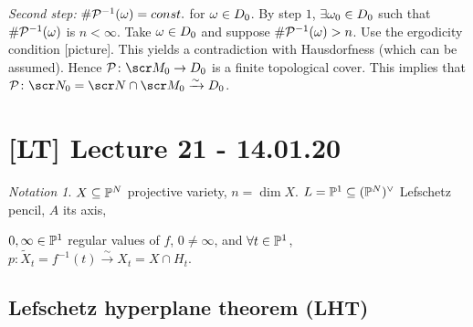 \documentclass[A4paper, british, reqno]{amsart}
\theoremstyle{darkgreentheorem}
\theoremstyle{darkbluedefinition}
\theoremstyle{darkredexample}
\theoremstyle{remark}
\newtheorem{nota}[thm]{Notation}
\newcommand{\1}{\mathbbm{1}}
\newcommand{\dual}{^{\vee}}
\newcommand{\sub}{\subseteq}
\begin{document}
\textit{Second step:}
$\# \calP^{-1}(\w)=const.$ for $\w\in D_{0}$.
By step $1$, $\exists \w_{0}\in D_{0}$ such that $\# \calP^{-1}(\w)$ is $n<\infty$.
Take $\w\in D_{0}$ and suppose $\# \calP^{-1}(\w)>n$.
Use the ergodicity condition [picture].
This yields a contradiction with Hausdorfness (which can be assumed).
Hence $\calP\colon \M_{0}\to D_{0}$ is a finite topological cover.
This implies that $\calP\colon \sN_{0}=\sN\cap \M_{0}\xrightarrow{\sim} D_{0}$.

\section{[LT] Lecture 21 - 14.01.20}

\begin{nota}
    $X\sub \P^{N}$ projective variety, $n=\dim{X}$.
    $L=\P^{1}\sub (\P^{N})\dual$ Lefschetz pencil, $A$ its axis,
    \begin{center}
    \end{center}
    $0,\infty\in\P^{1}$ regular values of $f$, $0\neq \infty$, and $\forall t\in \P^{1}$, $p\colon \tilde{X}_{t}=f^{-1}(t)\xrightarrow{\sim} X_{t}=X\cap H_{t}$.
    \begin{center}
    \end{center}
    \begin{center}
    \end{center}
\end{nota}

\subsection{Lefschetz hyperplane theorem (LHT)}
\end{document}
